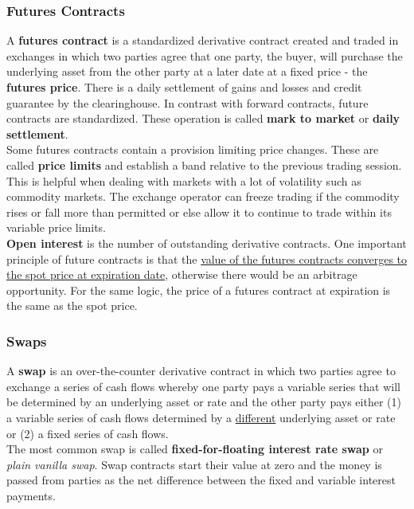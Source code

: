 \documentclass[fleqn,10pt]{SelfArx} %
\begin{document}
\subsubsection{Futures Contracts}

A \textbf{futures contract} is a standardized derivative contract created and traded in exchanges in which two parties agree that one party, the buyer, will purchase the underlying asset from the other party at a later date at a fixed price - the \textbf{futures price}. There is a daily settlement of gains and losses and credit guarantee by the clearinghouse. In contrast with forward contracts, future contracts are standardized. These operation is called \textbf{mark to market} or \textbf{daily settlement}.
\\
Some futures contracts contain a provision limiting price changes. These are called \textbf{price limits} and establish a band relative to the previous trading session. This is helpful when dealing with markets with a lot of volatility such as commodity markets. The exchange operator can freeze trading if the commodity rises or fall more than permitted or else allow it to continue to trade within its variable price limits.
\\
\textbf{Open interest} is the number of outstanding derivative contracts. One important principle of future contracts is that the \ul{value of the futures contracts converges to the spot price at expiration date}, otherwise there would be an arbitrage opportunity. For the same logic, the price of a futures contract at expiration is the same as the spot price.

\subsubsection{Swaps}

A \textbf{swap} is an over-the-counter derivative contract in which two parties agree to exchange a series of cash flows whereby one party pays a variable series that will be determined by an underlying asset or rate and the other party pays either (1) a variable series of cash flows determined by a \underline{different} underlying asset or rate or (2) a fixed series of cash flows.
\\
The most common swap is called \textbf{fixed-for-floating interest rate swap} or \textit{plain vanilla swap}. Swap contracts start their value at zero and the money is passed from parties as the net difference between the fixed and variable interest payments.
\end{document}
